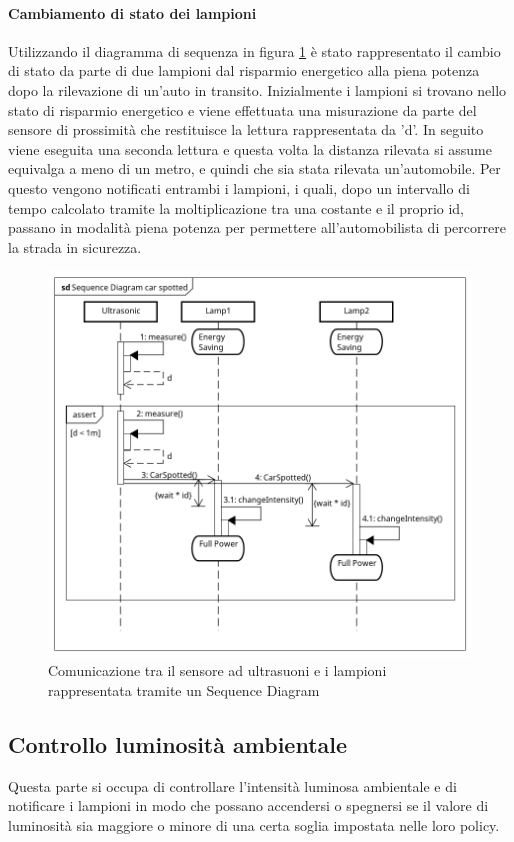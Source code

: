 \paragraph{Cambiamento di stato dei lampioni}
Utilizzando il diagramma di sequenza in figura \ref{SD CAR} è stato rappresentato il cambio di stato da parte di due lampioni dal risparmio energetico alla piena potenza dopo la rilevazione di un'auto in transito.
Inizialmente i lampioni si trovano nello stato di risparmio energetico e viene effettuata una misurazione da parte del sensore di prossimità che restituisce la lettura rappresentata da 'd'.
In seguito viene eseguita una seconda lettura e questa volta la distanza rilevata si assume equivalga a meno di un metro, e quindi che sia stata rilevata un'automobile.
Per questo vengono notificati entrambi i lampioni, i quali, dopo un intervallo di tempo calcolato tramite la moltiplicazione tra una costante e il proprio id, passano in modalità piena potenza per permettere all'automobilista di percorrere la strada in sicurezza.
\begin{figure}[tbp]
	\centering
	\includegraphics[scale=.59]{figure/Sequence_Diagram_car_spotted.png}
	\caption{Comunicazione tra il sensore ad ultrasuoni e i lampioni rappresentata tramite un Sequence Diagram \label{SD CAR}}
\end{figure}

\subsection{Controllo luminosità ambientale}
Questa parte si occupa di controllare l'intensità luminosa ambientale e di notificare i lampioni in modo che possano accendersi o spegnersi se il valore di luminosità sia maggiore o minore di una certa soglia impostata nelle loro policy.
